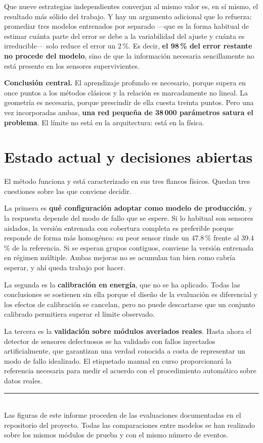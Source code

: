 \documentclass[11pt,a4paper]{article}
\begin{document}
Que nueve estrategias independientes converjan al mismo valor es, en sí mismo, el resultado
más sólido del trabajo. Y hay un argumento adicional que lo refuerza: promediar tres modelos
entrenados por separado ---que es la forma habitual de estimar cuánta parte del error se
debe a la variabilidad del ajuste y cuánta es irreducible--- solo reduce el error un 2\,\%.
Es decir, \textbf{el 98\,\% del error restante no procede del modelo}, sino de que la
información necesaria sencillamente no está presente en los sensores supervivientes.

\begin{idea}
\noindent\textbf{Conclusión central.} El aprendizaje profundo es necesario, porque supera en
once puntos a los métodos clásicos y la relación es marcadamente no lineal. La geometría es
necesaria, porque prescindir de ella cuesta treinta puntos. Pero una vez incorporadas ambas,
\textbf{una red pequeña de 38\,000 parámetros satura el problema}. El límite no está en la
arquitectura: está en la física.
\end{idea}

\section{Estado actual y decisiones abiertas}

El método funciona y está caracterizado en sus tres flancos físicos. Quedan tres cuestiones
sobre las que conviene decidir.

La primera es \textbf{qué configuración adoptar como modelo de producción}, y la respuesta
depende del modo de fallo que se espere. Si lo habitual son sensores aislados, la versión
entrenada con cobertura completa es preferible porque responde de forma más homogénea: su
peor sensor rinde un 47.8\,\% frente al 39.4\,\% de la referencia. Si se esperan grupos
contiguos, conviene la versión entrenada en régimen múltiple. Ambas mejoras no se acumulan
tan bien como cabría esperar, y ahí queda trabajo por hacer.

La segunda es la \textbf{calibración en energía}, que no se ha aplicado. Todas las
conclusiones se sostienen sin ella porque el diseño de la evaluación es diferencial y los
efectos de calibración se cancelan, pero no puede descartarse que un conjunto calibrado
permitiera superar el límite observado.

La tercera es la \textbf{validación sobre módulos averiados reales}. Hasta ahora el detector
de sensores defectuosos se ha validado con fallos inyectados artificialmente, que garantizan
una verdad conocida a costa de representar un modo de fallo idealizado. El etiquetado manual
en curso proporcionará la referencia necesaria para medir el acuerdo con el procedimiento
automático sobre datos reales.

\vfill
\begin{center}
\rule{0.4\textwidth}{0.4pt}\\[0.3cm]
\small Las figuras de este informe proceden de las evaluaciones documentadas en el
repositorio del proyecto. Todas las comparaciones entre modelos se han realizado sobre los
mismos módulos de prueba y con el mismo número de eventos.
\end{center}
\end{document}
